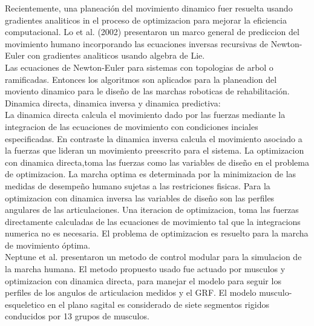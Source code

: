 \documentclass[10pt,onecolumn,twoside,letterpaper]{article}
\begin{document}
Recientemente, una planeaci\'on del movimiento dinamico fuer resuelta usando gradientes analiticos in el proceso de optimizacion para mejorar la eficiencia computacional. Lo et al. (2002) presentaron un marco general de prediccion del movimiento humano incorporando las ecuaciones inversas recursivas de Newton-Euler con gradientes analiticos usando algebra de Lie.\cite{Xiang2010}\\
Las ecuaciones de Newton-Euler para sistemas con topologias de arbol o ramificadas. Entonces los algoritmos son aplicados para la planeadion del moviento dinamico para le dise\~no de las marchas roboticas de rehabilitaci\'on.\cite{Xiang2010}\\
Dinamica directa, dinamica inversa y dinamica predictiva:\\
La dinamica directa calcula el movimiento dado por las fuerzas mediante la integracion de las ecuaciones de movimiento con condiciones inciales especificadas. En contraste la dinamica inversa calcula el movimiento asociado a la fuerzas que lideran un movimiento preescrito para el sistema. La optimizacion con dinamica directa,toma las fuerzas como las variables de dise\~no en el problema de optimizacion. La marcha optima es determinada por la minimizacion de las medidas de desempe\~no humano sujetas a las restriciones fisicas. Para la optimizacion con dinamica inversa las variables de dise\~no son las perfiles angulares de las articulaciones. Una iteracion de optimizacion, toma las fuerzas directamente calculadas de las ecuaciones de movimiento tal que la integracions numerica no es necesaria. El problema de optimizacion es resuelto para la marcha de movimiento \'optima.\cite{Xiang2010}\\
Neptune et al. presentaron un metodo de control modular para la simulacion de la marcha humana. El metodo propuesto usado fue actuado por musculos y optimizacion con dinamica directa, para manejar el modelo para seguir los perfiles de los angulos de articulacion medidos y el GRF. El modelo musculo-esqueletico en el plano sagital es considerado de siete segmentos rigidos conducidos por 13 grupos de musculos.\cite{Xiang2010}\\
\end{document}

